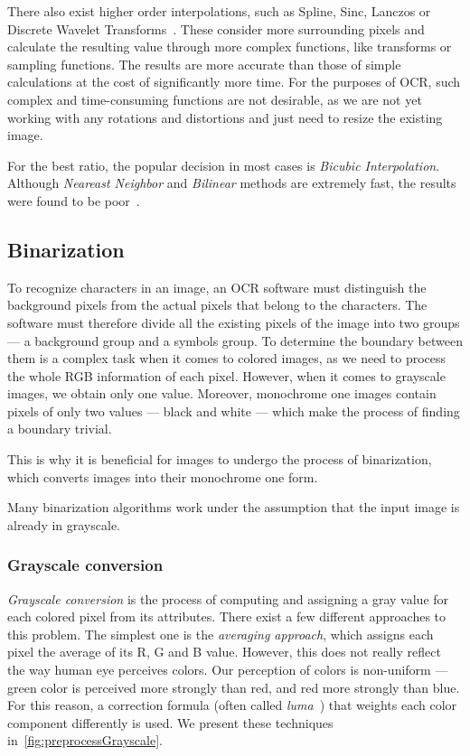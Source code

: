 There also exist higher order interpolations, such as Spline, Sinc, Lanczos or Discrete Wavelet Transforms~\cite{interpolation}. These consider more surrounding pixels and calculate the resulting value through more complex functions, like transforms or sampling functions. The results are more accurate than those of simple calculations at the cost of significantly more time. For the purposes of OCR, such complex and time-consuming functions are not desirable, as we are not yet working with any rotations and distortions and just need to resize the existing image.

 For the best  ratio, the popular decision in most cases is \emph{Bicubic Interpolation}. Although \emph{Neareast Neighbor} and \emph{Bilinear} methods are extremely fast, the results were found to be poor~\cite{interpolationComp}.

\subsection{Binarization}

To recognize characters in an image, an OCR software must distinguish the background pixels from the actual pixels that belong to the characters. The software must therefore divide all the existing pixels of the image into two groups --- a background group and a symbols group. To determine the boundary between them is a complex task when it comes to colored images, as we need to process the whole RGB information of each pixel. However, when it comes to grayscale images, we obtain only one value. Moreover, monochrome one images contain pixels of only two values --- black and white --- which make the process of finding a boundary trivial.

This is why it is beneficial for images to undergo the process of binarization, which converts images into their monochrome one form.

Many binarization algorithms work under the assumption that the input image is already in grayscale.

\subsubsection{Grayscale conversion}

\emph{Grayscale conversion} is the process of computing and assigning a gray value for each colored pixel from its attributes. There exist a few different approaches to this problem. The simplest one is the \emph{averaging approach}, which assigns each pixel the average of its R, G and B value. However, this does not really reflect the way human eye perceives colors. Our perception of colors is non-uniform --- green color is perceived more strongly than red, and red more strongly than blue. For this reason, a correction formula (often called \emph{luma}~\cite{grayscaleConv}) that weights each color component differently is used. We present these techniques in~\cref{fig:preprocessGrayscale}.

